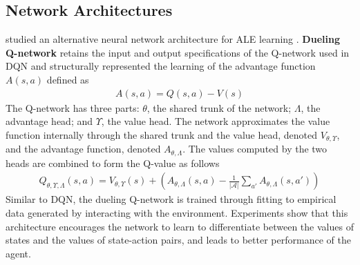 \subsection{Network Architectures}
\citeauthor{DuelingNetworkArchitectures_Wang.Schaul.ea_} studied an alternative neural network architecture for ALE learning \cite{DuelingNetworkArchitectures_Wang.Schaul.ea_}.
\textbf{Dueling Q-network} retains the input and output specifications of the Q-network used in DQN and structurally represented the learning of the advantage function $A(s, a)$ defined as
\begin{align*}
    A(s, a) = Q(s, a) - V(s)
\end{align*}
The Q-network has three parts:
$\theta$, the shared trunk of the network; $\varLambda$, the advantage head; and $\varUpsilon$, the value head.
The network approximates the value function internally through the shared trunk and the value head, denoted $V_{\theta, \varUpsilon}$, and the advantage function, denoted $A_{\theta, \varLambda}$.
The values computed by the two heads are combined to form the Q-value as follows
\begin{align*}
    Q_{\theta, \varUpsilon, \varLambda}(s, a)
    = V_{\theta, \varUpsilon}(s)
    + \left( A_{\theta, \varLambda}(s, a)
    - \frac{1}{| \mathcal{A} | } \sum_{a'}A_{\theta, \varLambda}(s, a') \right)
\end{align*}
Similar to DQN, the dueling Q-network is trained through fitting to empirical data generated by interacting with the environment.
Experiments show that this architecture encourages the network to learn to differentiate between the values of states and the values of state-action pairs, and leads to better performance of the agent.

